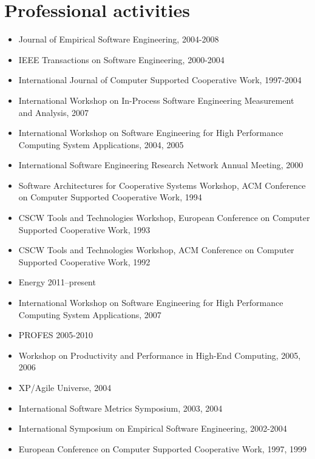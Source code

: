 \documentclass[11pt,letterpaper,sans]{moderncv} %
\begin{document}
\section{Professional activities}

\begin{itemize}
\item Journal of Empirical Software Engineering, 2004-2008
\item IEEE Transactions on Software Engineering, 2000-2004
\item International Journal of Computer Supported Cooperative Work, 1997-2004
\end{itemize}

\begin{itemize}
\item International Workshop on In-Process Software Engineering Measurement and Analysis, 2007
\item International Workshop on Software Engineering for High Performance Computing
  System Applications, 2004, 2005
\item International Software Engineering Research Network Annual Meeting, 2000
\item Software Architectures for Cooperative Systems Workshop, ACM Conference on
  Computer Supported Cooperative Work, 1994
\item CSCW Tools and Technologies Workshop, European Conference on Computer Supported
  Cooperative Work, 1993
\item CSCW Tools and Technologies Workshop, ACM Conference on Computer Supported Cooperative Work, 1992
\end{itemize}

\begin{itemize}
\item Energy 2011--present
\item International Workshop on Software Engineering for High Performance Computing
  System Applications, 2007
\item PROFES 2005-2010
\item Workshop on Productivity and Performance in High-End Computing, 2005, 2006
\item XP/Agile Universe, 2004
\item International Software Metrics Symposium, 2003, 2004
\item International Symposium on Empirical Software Engineering, 2002-2004
\item European Conference on Computer Supported Cooperative Work, 1997, 1999
\end{itemize}
\end{document}
